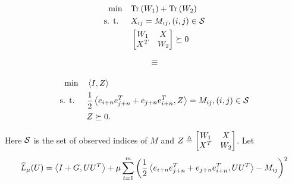 \begin{minipage}{0.2\linewidth}
	\begin{align*}
	\min &\quad \mathrm{Tr}\left(W_1\right) + \mathrm{Tr}\left(W_2\right)\\ \text{s. t. }&\quad X_{ij} =M_{ij}, (i,j) \in \mathcal{S} \\  &\quad \begin{bmatrix}W_1 & X \\ X^T & W_2\end{bmatrix} \succeq 0
	\end{align*}
\end{minipage}
\begin{minipage}{0.05\linewidth}
	\begin{align*}
		\equiv \\
	\end{align*} \break
\end{minipage}
\begin{minipage}{0.6\linewidth}
	\begin{align*}
	\min & \quad \left\langle I, Z \right\rangle \nonumber \\ \text{s. t. }&\quad \frac{1}{2}\left\langle e_{i+n}e_{j+n}^T + e_{j+n} e_{i+n}^T, Z \right\rangle = M_{ij}, (i,j) \in \mathcal{S} \nonumber \\  &\quad Z \succeq 0.
	\end{align*}
\end{minipage}
\noindent Here $\mathcal{S}$ is the set of observed indices of $M$ and $Z\triangleq \begin{bmatrix}W_1 & X \\ X^T & W_2\end{bmatrix}$. %
Let
\begin{align}
	\widehat{L}_{\mu}(U) = \left\langle I+G, UU^T \right\rangle + \mu \sum_{i=1}^m \left(\frac{1}{2}\left\langle e_{i+n}e_{j+n}^T + e_{j+n} e_{i+n}^T, UU^T \right\rangle - M_{ij} \right)^2  \label{eq:matcomp}
\end{align}

